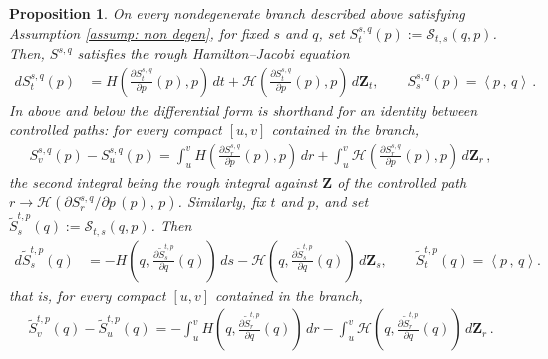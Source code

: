\documentclass[11pt, oneside]{article}
\numberwithin{equation}{section}
\newtheorem{proposition}[lemma]{Proposition}
\theoremstyle{definition}
\newcommand{\wt}[1]{\widetilde{#1}}
\newcommand{\mc}[1]{\mathcal{#1}}
\newcommand{\mcal}[1]{\mc{#1}}
\newcommand{\scp}[2]{{\left\langle {#1}\, , \, {#2}\right\rangle}}
\def\p{{\partial}}
\def\p{\partial}
\begin{document}
\begin{proposition}\label{prop:rough HJ}
On every nondegenerate branch described above satisfying Assumption \ref{assump: non degen}, for fixed $s$ and $q$, set $S^{s,q}_t(p):=\mcal S_{t,s}(q,p)$. Then, $S^{s,q}$ satisfies the rough Hamilton--Jacobi equation
\begin{align}
    d S^{s,q}_t(p)
    &=H\left(\frac{\p S^{s,q}_t}{\p p}(p),p\right)\,dt
      +\mcal H\left(\frac{\p S^{s,q}_t}{\p p}(p),p\right)\,d\mathbf Z_t,
      \qquad S^{s,q}_s(p)=\scp{p}{q}\,.
      \label{eq:rough HJ 1}
\end{align}
In above and below the differential form is shorthand for an identity between controlled paths: for every compact $[u,v]$ contained in the branch,
\begin{align*}
    S^{s,q}_v(p) - S^{s,q}_u(p)
    = \int_u^v H\left(\frac{\p S^{s,q}_r}{\p p}(p),p\right)\,dr
      + \int_u^v \mcal H\left(\frac{\p S^{s,q}_r}{\p p}(p),p\right)\,d\mathbf Z_r\,,
\end{align*}
the second integral being the rough integral against $\mathbf Z$ of the controlled path $r \rightarrow \mcal H\left(\p S^{s,q}_r/\p p\,(p),\,p\right)$. Similarly, fix $t$ and $p$, and set $\wt S^{t,p}_s(q):=\mcal S_{t,s}(q,p)$. Then
\begin{align}
    d \wt S^{t,p}_s(q)
    &=-H\left(q,\frac{\p\wt S^{t,p}_s}{\p q}(q)\right)\,ds
      -\mcal H\left(q,\frac{\p\wt S^{t,p}_s}{\p q}(q)\right)\,d\mathbf Z_s,
      \qquad \wt S^{t,p}_t(q)=\scp{p}{q}.
      \label{eq:rough HJ 2}
\end{align}
that is, for every compact $[u,v]$ contained in the branch,
\begin{align*}
    \wt S^{t,p}_v(q) - \wt S^{t,p}_u(q)
    = -\int_u^v H\left(q,\frac{\p\wt S^{t,p}_r}{\p q}(q)\right)\,dr
      - \int_u^v \mcal H\left(q,\frac{\p\wt S^{t,p}_r}{\p q}(q)\right)\,d\mathbf Z_r\,.
\end{align*}
\end{proposition}
\end{document}
